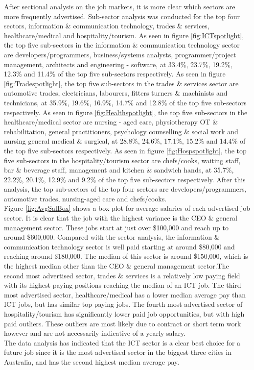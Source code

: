 \documentclass[twoside, 12pt, a4paper]{article}
\begin{document}
After sectional analysis on the job markets, it is more clear which sectors are more frequently advertised. Sub-sector analysis was conducted for the top four sectors, information \& communication technology, trades \& services, healthcare/medical and hospitality/tourism. As seen in figure \ref{fig:ICTspotlight}, the top five sub-sectors in the information \& communication technology sector are developers/programmers, business/systems analysts, programmer/project management, architects and engineering - software, at 33.4\%, 23.7\%, 19.2\%, 12.3\% and 11.4\% of the top five sub-sectors respectively. As seen in figure \ref{fig:Tradespotlight}, the top five sub-sectors in the trades \& services sector are automotive trades, electricians, labourers, fitters turners \& machinists and technicians, at 35.9\%, 19.6\%, 16.9\%, 14.7\% and 12.8\% of the top five sub-sectors respectively. As seen in figure \ref{fig:Healthspotlight}, the top five sub-sectors in the healthcare/medical sector are nursing - aged care, physiotherapy OT \& rehabilitation, general practitioners, psychology counselling \& social work and nursing general medical \& surgical, at 28.8\%, 24.6\%, 17.1\%, 15.2\% and 14.4\% of the top five sub-sectors respectively. As seen in figure \ref{fig:Hospspotlight}, the top five sub-sectors in the hospitality/tourism sector are chefs/cooks, waiting staff, bar \& beverage staff, management and kitchen \& sandwich hands, at 35.7\%, 22.2\%, 20.1\%, 12.9\% and 9.2\% of the top five sub-sectors respectively. After this analysis, the top sub-sectors of the top four sectors are developers/programmers, automotive trades, nursing-aged care and chefs/cooks.\\
Figure \ref{fig:AvgSalBox} shows a box plot for average salaries of each advertised job sector. It is clear that the job with the highest variance is the CEO \& general management sector. These jobs start at just over \$100,000 and reach up to around \$600,000. Compared with the sector analysis, the information \& communication technology sector is well paid starting at around \$80,000 and reaching around \$180,000. The median of this sector is around \$150,000, which is the highest median other than the CEO \& general management sector.The second most advertised sector, trades \& services is a relatively low paying field with its highest paying positions reaching the median of an ICT job. The third most advertised sector, healthcare/medical has a lower median average pay than ICT jobs, but has similar top paying jobs. The fourth most advertised sector of hospitality/tourism has significantly lower paid job opportunities, but with high paid outliers. These outliers are most likely due to contract or short term work however and are not necessarily indicative of a yearly salary.\\
The data analysis has indicated that the ICT sector is a clear best choice for a future job since it is the most advertised sector in the biggest three cities in Australia, and has the second highest median average pay. 
\end{document}
